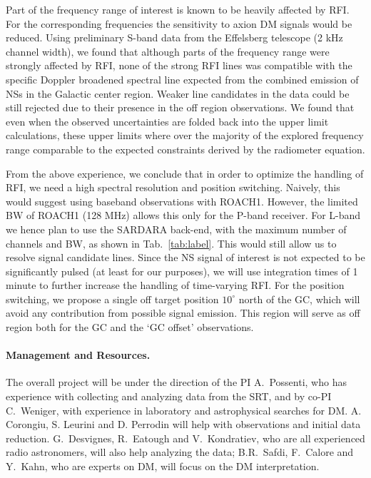 \documentclass[a4paper, 11pt]{article}
\begin{document}

Part of the frequency range of interest is known to be heavily affected by RFI.   For the corresponding frequencies the sensitivity to axion DM signals would be reduced.  
%
Using preliminary S-band data from the Effelsberg telescope (2 kHz channel width), we found that although parts of the frequency range were strongly affected by RFI, none of the strong RFI lines was compatible with the specific Doppler broadened spectral line expected from the combined emission of NSs in the Galactic center region.  Weaker line candidates in the data could be still rejected due to their presence in the off region observations.  We found that even when the observed uncertainties are folded back into the upper limit calculations, these upper limits where over the majority of the explored frequency range comparable to the expected constraints derived by the radiometer equation.

From the above experience, we conclude that in order to optimize the handling of RFI, we need a high spectral resolution and position switching.  Naively, this would suggest using baseband observations with ROACH1.  However, the limited BW of ROACH1 (128 MHz) allows this only for the P-band receiver.  For L-band we hence plan to use the SARDARA back-end, with the maximum number of channels and BW, as shown in Tab.~\ref{tab:label}.  This would still allow us to resolve signal candidate lines.  Since the NS signal of interest is not expected to be significantly pulsed (at least for our purposes), we will use integration times of 1 minute to further increase the handling of time-varying RFI. For the position switching, we propose a single off target position $10^\circ$ north of the GC, which will avoid any contribution from possible signal emission.  This region will serve as off region both for the GC and the `GC offset' observations.

\paragraph{Management and Resources.} The overall project will be under the direction of the PI A.~Possenti, who has experience with collecting and analyzing data from the SRT, and by co-PI C.~Weniger, with experience in laboratory and astrophysical searches for DM.
A. Corongiu, S. Leurini and D. Perrodin will help with observations and initial data reduction. G.~Desvignes, R.~Eatough and V.~Kondratiev, who are all experienced radio astronomers, will also help analyzing the data; B.R.~Safdi, F.~Calore and Y.~Kahn, who are experts on DM, will focus on the DM interpretation.  
\end{document}
